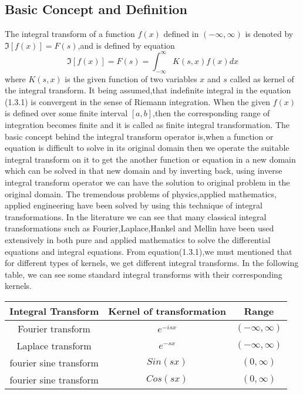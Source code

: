 \begin{large}
\subsection{Basic Concept and Definition}

The integral transform of a function $f(x)$ defined in $ (-\infty,\infty) $ is denoted by $\mathfrak{I}[f(x)]=F(s)$,and is defined by equation
\begin{equation}
\mathfrak{I}[f(x)]=F(s)=\int_{-\infty}^{\infty}K(s,x)f(x)dx
\end{equation}
where $K(s,x)$ is the given function of two variables $x$ and $s$ called as kernel of the integral transform. It being assumed,that indefinite integral in the equation (1.3.1) is convergent in the sense of Riemann integration. When the given $f(x)$ is defined over some finite interval $[a,b]$,then the corresponding range of integration becomes finite and it is called as finite integral transformation. The basic concept behind the integral transform operator is,when a function or equation is difficult to solve in its original domain then we operate the suitable integral transform on it to get the another function or equation in a new domain which can be solved in that new domain and by inverting back, using inverse integral transform operator we can have the solution to original problem in the original domain. The tremendous problems of physics,applied mathematics, applied engineering have been solved by using this technique of integral transformations. In the literature we can see that many classical integral transformations such as Fourier,Laplace,Hankel and Mellin have been used extensively in both pure and applied mathematics to solve the differential equations and integral equations.
From equation(1.3.1),we must mentioned that for different types of kernels, we get different integral transforms. In the following table, we can see some standard integral transforms with their corresponding kernels.
\begin{center}
\begin{tabular}{|c|c|c|} 
\hline
 Integral Transform & Kernel of transformation & Range \\ [0.5ex]
 \hline
 Fourier transform & $e^{-isx}$ & $(-\infty,\infty)$ \\ 
 \hline
 Laplace transform & $e^{-sx}$ & $(-\infty,\infty)$  \\ 
 \hline
 fourier sine transform & $ Sin(sx) $ & $(0,\infty)$ \\
 \hline
   fourier sine transform & $ Cos(sx) $  & $(0,\infty)$ \\

\end{tabular}
\end{center}
\end{large}
